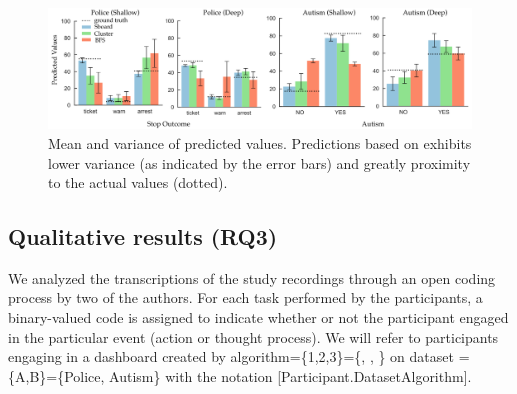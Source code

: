 \begin{figure}[bht]
\centering
\includegraphics[width=\linewidth]{figures/Prediction_Actual.png}
\caption{Mean and variance of predicted values. Predictions based on \system exhibits lower variance (as indicated by the error bars) and greatly proximity to the actual values (dotted).}
\label{fig:actual_predictions}
\end{figure}
\subsection{Qualitative results (RQ3)}
We analyzed the transcriptions of the study recordings through an open coding process by two of the authors. For each task performed by the participants, a binary-valued code is assigned to indicate whether or not the participant engaged in the particular event (action or thought process). We will refer to participants engaging in a dashboard created by algorithm=\{1,2,3\}=\{\system, \cluster, \BFS\} on dataset =\{A,B\}=\{Police, Autism\} with the notation [Participant.DatasetAlgorithm].

